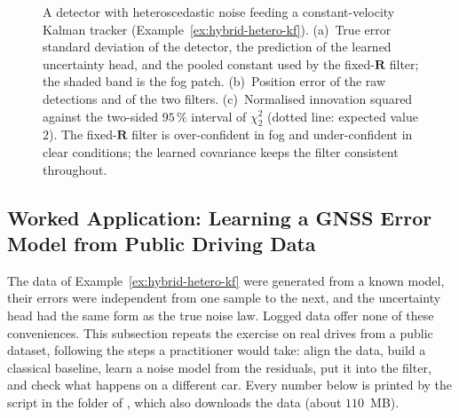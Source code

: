 \begin{figure}[!t]
{
}
\caption{A detector with heteroscedastic noise feeding a constant-velocity Kalman tracker (Example~\ref{ex:hybrid-hetero-kf}). (a)~True error standard deviation of the detector, the prediction of the learned uncertainty head, and the pooled constant used by the fixed-$\mathbf{R}$ filter; the shaded band is the fog patch. (b)~Position error of the raw detections and of the two filters. (c)~Normalised innovation squared against the two-sided $95\,\%$ interval of $\chi^{2}_{2}$ (dotted line: expected value $2$). The fixed-$\mathbf{R}$ filter is over-confident in fog and under-confident in clear conditions; the learned covariance keeps the filter consistent throughout.}
\label{fig:hybrid-hetero-kf}
\end{figure}

\subsection{Worked Application: Learning a GNSS Error Model from Public Driving Data}
\label{subsec:c2k-application}
The data of Example~\ref{ex:hybrid-hetero-kf} were generated from a known model, their errors were independent from one sample to the next, and the uncertainty head had the same form as the true noise law. Logged data offer none of these conveniences. This subsection repeats the exercise on real drives from a public dataset, following the steps a practitioner would take: align the data, build a classical baseline, learn a noise model from the residuals, put it into the filter, and check what happens on a different car. Every number below is printed by the script in the folder  of , which also downloads the data (about $110$~MB).

